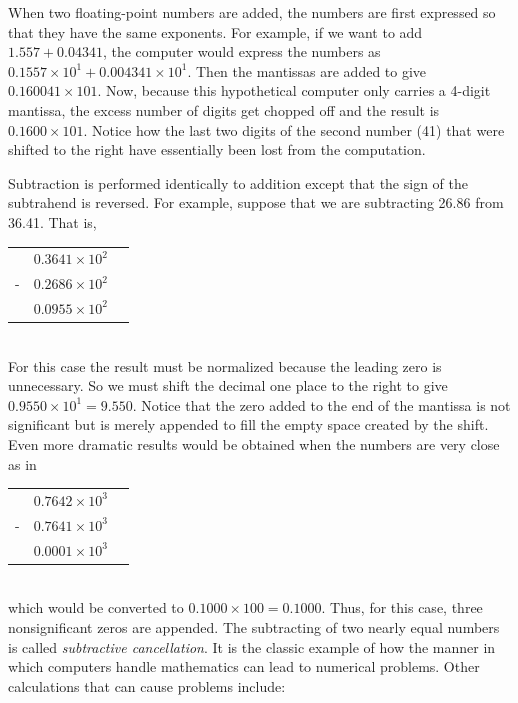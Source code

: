\documentclass[../main.tex]{subfiles}
\begin{document}
When two floating-point numbers are added, the numbers are first expressed so that
they have the same exponents. For example, if we want to add $1.557 + 0.04341$, the computer
would express the numbers as \\$0.1557\times 10^1 + 0.004341\times 10^1$. Then the mantissas
are added to give $0.160041 \times 101$. Now, because this hypothetical computer only carries a
4-digit mantissa, the excess number of digits get chopped off and the result is $0.1600\times 101$.
Notice how the last two digits of the second number (41) that were shifted to the right have
essentially been lost from the computation.

Subtraction is performed identically to addition except that the sign of the subtrahend
is reversed. For example, suppose that we are subtracting 26.86 from 36.41. That is,\\

\begin{tabular}{c c c}
        & $0.3641 \times 10^2$\\
    -   & $0.2686 \times 10^2$\\
        \hline
        & $0.0955 \times 10^2$\\
\end{tabular}\\

For this case the result must be normalized because the leading zero is unnecessary. So
we must shift the decimal one place to the right to give $0.9550 \times 10^1 = 9.550$. Notice that
the zero added to the end of the mantissa is not significant but is merely appended to fill the
empty space created by the shift. Even more dramatic results would be obtained when the
numbers are very close as in\\

\begin{tabular}{c c c}
    & $0.7642 \times 10^3$\\
-   & $0.7641 \times 10^3$\\
    \hline
    & $0.0001 \times 10^3$\\
\end{tabular}\\

\noindent
which would be converted to $0.1000 \times 100 = 0.1000$. Thus, for this case, three nonsignificant
zeros are appended.
The subtracting of two nearly equal numbers is called \emph{subtractive cancellation}. It is
the classic example of how the manner in which computers handle mathematics can lead to
numerical problems. Other calculations that can cause problems include:\\
\end{document}
